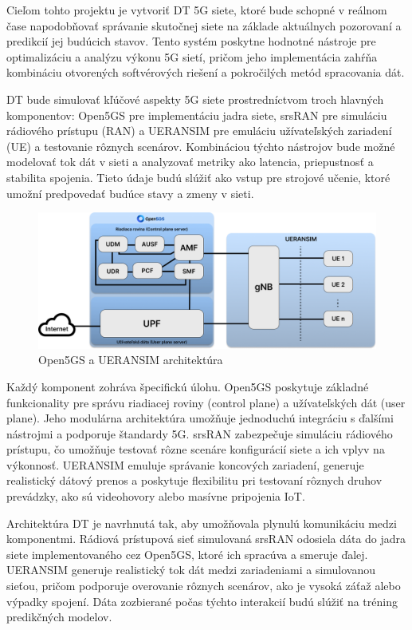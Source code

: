 \par{
Cieľom tohto projektu je vytvoriť DT 5G siete, ktoré bude schopné v reálnom čase napodobňovať správanie skutočnej siete na základe aktuálnych pozorovaní a predikcií jej budúcich stavov. Tento systém poskytne hodnotné nástroje pre optimalizáciu a analýzu výkonu 5G sietí, pričom jeho implementácia zahŕňa kombináciu otvorených softvérových riešení a pokročilých metód spracovania dát.
}

\par{
DT bude simulovať kľúčové aspekty 5G siete prostredníctvom troch hlavných komponentov: Open5GS pre implementáciu jadra siete, srsRAN pre simuláciu rádiového prístupu (RAN) a UERANSIM pre emuláciu užívateľských zariadení (UE) a testovanie rôznych scenárov. Kombináciou týchto nástrojov bude možné modelovať tok dát v sieti a analyzovať metriky ako latencia, priepustnosť a stabilita spojenia. Tieto údaje budú slúžiť ako vstup pre strojové učenie, ktoré umožní predpovedať budúce stavy a zmeny v sieti.
}

\begin{figure}[H]
    \centering
    \includegraphics[width=0.7\linewidth]{assets/images/open5gs+ueran.png}
    \caption{Open5GS a UERANSIM architektúra}
\end{figure}

\par{
Každý komponent zohráva špecifickú úlohu. Open5GS poskytuje základné funkcionality pre správu riadiacej roviny (control plane) a užívateľských dát (user plane). Jeho modulárna architektúra umožňuje jednoduchú integráciu s ďalšími nástrojmi a podporuje štandardy 5G. srsRAN zabezpečuje simuláciu rádiového prístupu, čo umožňuje testovať rôzne scenáre konfigurácií siete a ich vplyv na výkonnosť. UERANSIM emuluje správanie koncových zariadení, generuje realistický dátový prenos a poskytuje flexibilitu pri testovaní rôznych druhov prevádzky, ako sú videohovory alebo masívne pripojenia IoT.
}

\par{
Architektúra DT je navrhnutá tak, aby umožňovala plynulú komunikáciu medzi komponentmi. Rádiová prístupová sieť simulovaná srsRAN odosiela dáta do jadra siete implementovaného cez Open5GS, ktoré ich spracúva a smeruje ďalej. UERANSIM generuje realistický tok dát medzi zariadeniami a simulovanou sieťou, pričom podporuje overovanie rôznych scenárov, ako je vysoká záťaž alebo výpadky spojení. Dáta zozbierané počas týchto interakcií budú slúžiť na tréning predikčných modelov.
}

